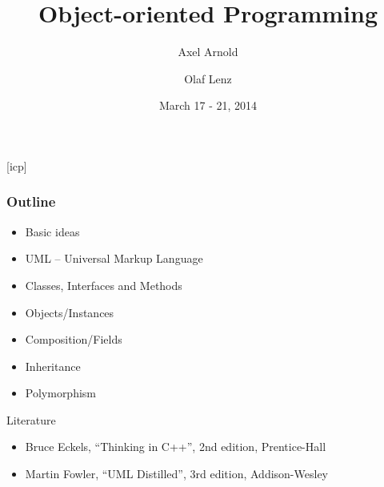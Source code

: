 \documentclass{slides}
\begin{document}
\graphicspath{{figures/}}

\title[Object-oriented Programming]{\Large Object-oriented Programming}

\author[A. Arnold and O. Lenz]{Axel Arnold \and Olaf Lenz} 
\date{March 17 - 21, 2014}

\begin{frame}
  \titlepage
\end {frame}
[icp]

\begin{frame}
  \frametitle{Outline}

  \begin{itemize}
  \item Basic ideas
  \item UML -- Universal Markup Language
  \item Classes, Interfaces and Methods
  \item Objects/Instances
  \item Composition/Fields
  \item Inheritance
  \item Polymorphism
  \end{itemize}

  \begin{block}{Literature}
    \begin{itemize}
    \item Bruce Eckels, ``Thinking in C++'', 2nd edition, Prentice-Hall
    \item Martin Fowler, ``UML Distilled'', 3rd edition, Addison-Wesley
    \end{itemize}
  \end{block}
  
\end{frame}
\end{document}
